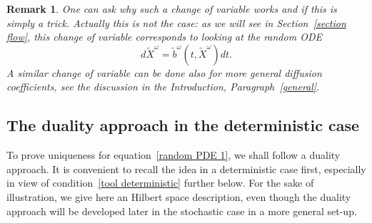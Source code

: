 \documentclass[a4paper,10pt]{article}
\newtheorem{remark}[theorem]{Remark}
\newcommand\1{\mathbbm{1}}
\newcommand{\td}{\tilde}
\numberwithin{equation}{section}
\begin{document}
\begin{remark}
One can ask why such a change of variable works and if this is simply a trick. Actually this is not the case: as we will see in Section~\ref{section flow}, this change of variable corresponds to looking at the random ODE
\begin{equation*}
d\td{X}^\omega=\td{b}^\omega(t,\td{X}^\omega)dt.
\end{equation*}
A similar change of variable can be done also for more general diffusion coefficients, see the discussion in the Introduction, Paragraph~\ref{general}.
\end{remark}

\subsection{The duality approach in the deterministic
case\label{subsection determ duality}}

To prove uniqueness for equation~\eqref{random PDE 1}, we shall follow a duality approach. It is convenient to recall the idea in a deterministic case first, especially in view of condition~\eqref{tool deterministic} further below. For the sake of illustration, we give here an Hilbert space description, even though the duality approach will be developed later in the stochastic case in a more general set-up. 
\end{document}
